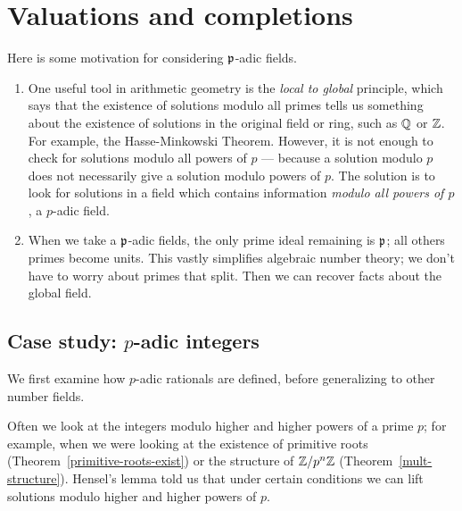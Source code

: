 \chapter{Valuations and completions}
Here is some motivation for considering $\mathfrak{p}$-adic fields.
\begin{enumerate}
\item One useful tool in arithmetic geometry is the {\it local to global} principle, which says that the existence of solutions modulo all primes tells us something about the existence of solutions in the original field or ring, such as $\mathbb{Q}$ or $\mathbb{Z}$. For example, the Hasse-Minkowski Theorem. However, it is not enough to check for solutions modulo all powers of $p$ --- because a solution modulo $p$ does not necessarily give a solution modulo powers of $p$. The solution is to look for solutions in a field which contains information {\it modulo all powers of $p$}, a $p$-adic field.
\item When we take a $\mathfrak{p}$-adic fields, the only prime ideal remaining is $\mathfrak{p}$; all others primes become units. This vastly simplifies algebraic number theory; we don't have to worry about primes that split. Then we can recover facts about the global field.
\end{enumerate}
\section{Case study: $p$-adic integers}
We first examine how $p$-adic rationals are defined, before generalizing to other number fields.

Often we look at the integers modulo higher and higher powers of a prime $p$; for example,  when we were looking at the existence of primitive roots (Theorem~\ref{primitive-roots-exist}) or the structure of $\mathbb{Z}/p^n\mathbb{Z}$ (Theorem~\ref{mult-structure}). Hensel's lemma told us that under certain conditions we can lift solutions modulo higher and higher powers of $p$.

